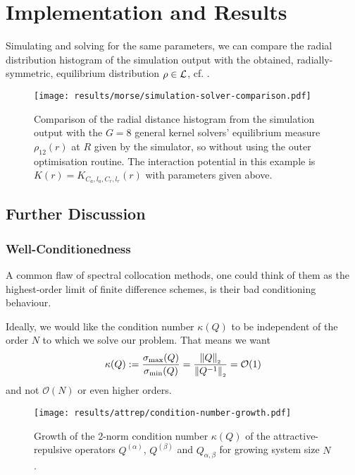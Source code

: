 \chapter{Implementation and Results}
\label{chap:implementation-and-results}

Simulating and solving for the same parameters, we can compare the radial distribution histogram of the simulation output with the obtained, radially-symmetric, equilibrium distribution $\rho \in \mathcal{L}$, cf. .


\begin{figure}[H]
  \centering
  \texttt{[image: results/morse/simulation-solver-comparison.pdf]}
  \caption[Comparison of histogram and spectral method solution]{Comparison of the radial distance histogram from the simulation output with the $G = 8$ general kernel solvers' equilibrium measure $\rho_{12}(r)$ at $R$ given by the simulator, so without using the outer optimisation routine. The interaction potential in this example is $K(r) = K_{C_a, l_a, C_r, l_r}(r)$ with parameters given above.}
  \label{fig:simulation-solver-comparison}
\end{figure}

\section{Further Discussion}
\subsection{Well-Conditionedness}
A common flaw of spectral collocation methods, one could think of them as the highest-order limit of finite difference schemes, is their bad conditioning behaviour.

Ideally, we would like the condition number $\kappa(Q)$ to be independent of the order $N$ to which we solve our problem. That means we want
$$\kappa(Q) := \frac{\sigma_{\rm max}(Q)}{\sigma_{\rm min}(Q)} = \frac{\left\lVert Q\right\rVert_{\scriptscriptstyle 2}}{\left\lVert Q^{-1}\right\rVert_{\scriptscriptstyle 2}} = \mathcal{O}(1)$$
and not $\mathcal{O}(N)$ or even higher orders.

\begin{figure}[H]
  \centering
  \texttt{[image: results/attrep/condition-number-growth.pdf]}
  \caption[Growth of the condition number]{Growth of the 2-norm condition number $\kappa(Q)$ of the attractive-repulsive operators $Q^{(\alpha)}$, $Q^{(\beta)}$ and $Q_{\alpha,\beta}$ for growing system size $N$.}
  \label{fig:condition-number-growth}
\end{figure}

